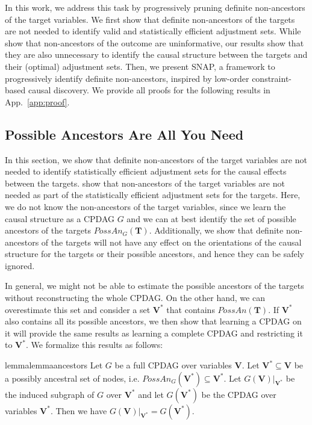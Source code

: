 In this work, we address this task by progressively pruning definite non-ancestors of the target variables. 
We first show that definite non-ancestors of the targets are not needed to identify valid and statistically efficient adjustment sets. While \citet{guo2023variable} show that non-ancestors of the outcome are uninformative, our results show that they are also unnecessary to identify the causal structure between the targets and their (optimal) adjustment sets.
Then, we present \acf{SNAP}, a framework to progressively identify definite non-ancestors, inspired by low-order constraint-based causal discovery.
We provide all proofs for the following results in App.~\ref{app:proof}.

\subsection{Possible Ancestors Are All You Need}
\label{sec:pruning}
In this section, we show that definite non-ancestors of the target variables are not needed to identify statistically efficient adjustment sets for the causal effects between the targets. \cite{guo2023variable} show that non-ancestors of the target variables are not needed as part of the statistically efficient adjustment sets for the targets. Here, we do not know the non-ancestors of the target variables, since we learn the causal structure as a CPDAG $G$ and we can at best identify the set of possible ancestors of the targets $PossAn_G(\mathbf{T})$. Additionally, we show that definite non-ancestors of the targets will not have any effect on the orientations of the causal structure for the targets or their possible ancestors, and hence they can be safely ignored. 

In general, we might not be able to estimate the possible ancestors of the targets without reconstructing the whole CPDAG.
On the other hand, we can overestimate this set and consider a set $\mathbf{V}^*$ that contains  $PossAn(\mathbf{T})$. If $\mathbf{V}^*$ also contains all its possible ancestors, we then show that learning a CPDAG on it will provide the same results as learning a complete CPDAG and restricting it to $\mathbf{V}^*$. 
We formalize this results as follows:

\begin{restatable}[]{lemma}{lemmaancestors}
\label{thm:ancestors}
Let $G$ be a full \ac{CPDAG} over variables $\mathbf{V}$. 
Let $\mathbf{V}^* \subseteq \mathbf{V}$ be a possibly ancestral set of nodes, i.e. $PossAn_G(\mathbf{V}^*) \subseteq \mathbf{V}^*$.
Let $G(\mathbf{V})|_{\mathbf{V}^*}$ be the induced subgraph of $G$ over $\mathbf{V}^*$ and let $G(\mathbf{V}^*)$ be the CPDAG over variables $\mathbf{V}^*$. Then we have $G(\mathbf{V})|_{\mathbf{V}^*} = G(\mathbf{V}^*)$.
\end{restatable}

